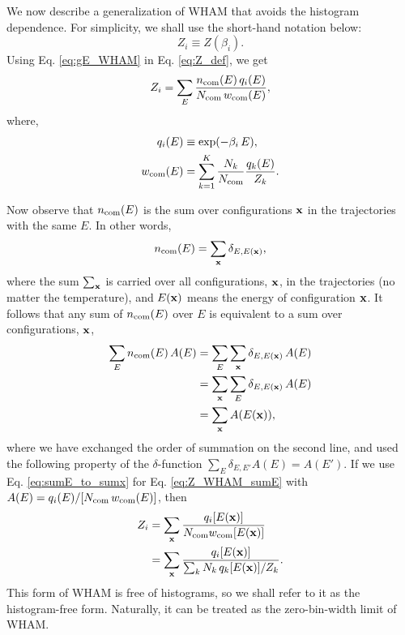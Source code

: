 \documentclass[aip,jcp,preprint,superscriptaddress]{revtex4-1}
\begin{document}
We now describe a generalization of WHAM
that avoids the histogram dependence.
%
For simplicity,
we shall use the short-hand notation below:
\[
  Z_i \equiv Z(\beta_i).
\]
%
Using Eq. \eqref{eq:gE_WHAM}
in Eq. \eqref{eq:Z_def},
we get
\begin{align}
  Z_i
  =
  \sum_E
  \frac{ n_{\mathrm{com}} (E) \, q_i(E) }
       { N_{\mathrm{com}} \, w_{\mathrm{com}}(E) },
  \label{eq:Z_WHAM_sumE}
\end{align}
%
where,
\begin{align}
  q_i(E) &\equiv \exp(-\beta_i \, E), \\
  w_{\mathrm{com}}(E) &= \sum_{k = 1}^K
  \frac{ N_k } { N_{\mathrm{com}} }
  \frac{ q_k(E) } { Z_k }.
  \label{eq:wcom_def}
\end{align}



Now observe that
$n_{\mathrm{com}}(E)$
is the sum over configurations $\mathbf{x}$ in the trajectories
with the same $E$.
%
In other words,
\begin{align}
  n_{\mathrm{com}}(E)
  =
  \sum_{\mathbf{x}} \delta_{E, E(\mathbf{x})},
  \label{eq:nE_sumx}
\end{align}
%
where the sum $\sum_{\mathbf{x}}$
is carried over all configurations, $\mathbf{x}$,
in the trajectories (no matter the temperature),
and $E(\mathbf{x})$ means the energy of configuration $\mathbf{x}$.
%
It follows that any sum of $n_{\mathrm{com}}(E)$ over $E$
is equivalent to a sum over configurations, $\mathbf{x}$,
\begin{align}
  \sum_E n_{\mathrm{com}}(E) \, A(E)
  &=
  \sum_E \sum_{\mathbf{x}} \delta_{E, E(\mathbf{x})} \, A(E)
  \notag \\
  &=
  \sum_{\mathbf{x}} \sum_{E} \delta_{E, E(\mathbf{x})} \, A(E)
  \notag \\
  &=
  \sum_{\mathbf{x}} A(E(\mathbf{x})),
  \label{eq:sumE_to_sumx}
\end{align}
%
where we have exchanged the order of summation
on the second line,
and used the following property of the $\delta$-function
%
$\sum_E \delta_{E, E'} A(E) = A(E')$.
%
If we use Eq. \eqref{eq:sumE_to_sumx}
for Eq. \eqref{eq:Z_WHAM_sumE}
with $A(E) = q_i(E)/[N_{\mathrm{com}} \, w_{\mathrm{com}}(E)]$,
then
%
\begin{align}
  Z_i
  &=
  \sum_{\mathbf{x}}
  \frac{ q_i[ E(\mathbf{x}) ] }
       { N_{\mathrm{com}} w_{\mathrm{com}}[ E(\mathbf{x}) ] }
        \notag \\
  &=
  \sum_{\mathbf{x}}
  \frac{ q_i[ E(\mathbf{x}) ] }
  { \sum_k N_k \, q_k[ E(\mathbf{x}) ] / Z_k }.
  \label{eq:Z_WHAM_sumx}
\end{align}
%
This form of WHAM is free of histograms,
so we shall refer to it as the histogram-free form.
%
Naturally,
it can be treated as the zero-bin-width
limit of WHAM.
\end{document}
